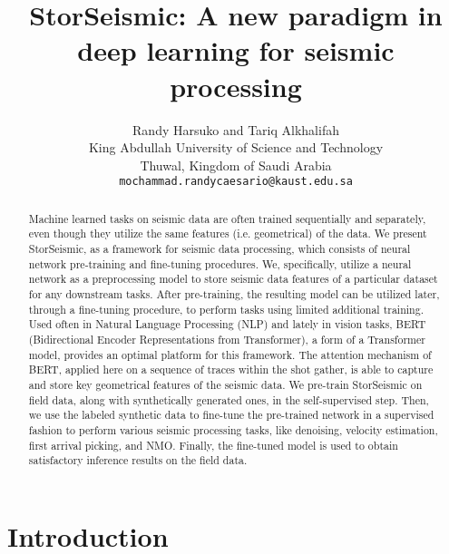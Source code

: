 \documentclass{article}
\title{StorSeismic: A new paradigm in deep learning for seismic processing
}
\author{
  Randy Harsuko and Tariq Alkhalifah \\
  King Abdullah University of Science and Technology \\
  Thuwal, Kingdom of Saudi Arabia \\
  \texttt{mochammad.randycaesario@kaust.edu.sa} \\
}
\begin{document}
\maketitle


\begin{abstract}
    Machine learned tasks on seismic data are often trained sequentially and separately, even though they utilize the same features (i.e. geometrical) of the data. We present StorSeismic, as a framework for seismic data processing, which consists of neural network pre-training and fine-tuning procedures. We, specifically, utilize a neural network as a preprocessing model to store seismic data features of a particular dataset for any downstream tasks. After pre-training, the resulting model can be utilized later, through a fine-tuning procedure, to perform tasks using limited additional training. Used often in Natural Language Processing (NLP) and lately in vision tasks, BERT (Bidirectional Encoder Representations from Transformer), a form of a Transformer model, provides an optimal platform for this framework. The attention mechanism of BERT, applied here on a sequence of traces within the shot gather, is able to capture and store key geometrical features of the seismic data. We pre-train StorSeismic on field data, along with synthetically generated ones, in the self-supervised step. Then, we use the labeled synthetic data to fine-tune the pre-trained network in a supervised fashion to perform various seismic processing tasks, like denoising, velocity estimation, first arrival picking, and NMO. Finally, the fine-tuned model is used to obtain satisfactory inference results on the field data.

\end{abstract}




\section{Introduction}
\end{document}
